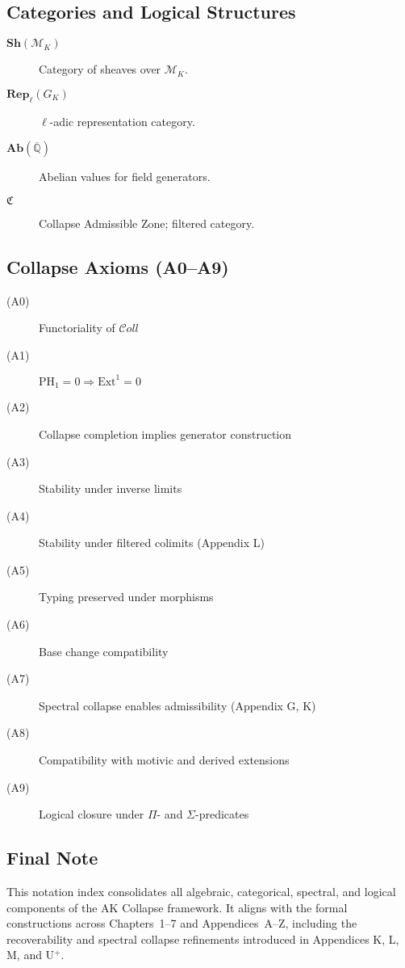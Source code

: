 \documentclass[11pt]{article}
\begin{document}
\subsection*{Categories and Logical Structures}

\begin{description}
  \item[\( \mathbf{Sh}(\mathcal{M}_K) \)] Category of sheaves over \( \mathcal{M}_K \).
  \item[\( \mathbf{Rep}_\ell(G_K) \)] \( \ell \)-adic representation category.
  \item[\( \mathbf{Ab}(\overline{\mathbb{Q}}) \)] Abelian values for field generators.
  \item[\( \mathfrak{C} \)] Collapse Admissible Zone; filtered category.
\end{description}

\subsection*{Collapse Axioms (A0–A9)}

\begin{description}
  \item[(A0)] Functoriality of \( \mathcal{C}oll \)
  \item[(A1)] \( \mathrm{PH}_1 = 0 \Rightarrow \mathrm{Ext}^1 = 0 \)
  \item[(A2)] Collapse completion implies generator construction
  \item[(A3)] Stability under inverse limits
  \item[(A4)] Stability under filtered colimits (Appendix L)
  \item[(A5)] Typing preserved under morphisms
  \item[(A6)] Base change compatibility
  \item[(A7)] Spectral collapse enables admissibility (Appendix G, K)
  \item[(A8)] Compatibility with motivic and derived extensions
  \item[(A9)] Logical closure under \( \Pi \)- and \( \Sigma \)-predicates
\end{description}

\subsection*{Final Note}

This notation index consolidates all algebraic, categorical, spectral, and logical components of the AK Collapse framework.  
It aligns with the formal constructions across Chapters~1–7 and Appendices~A–Z, including the recoverability and spectral collapse refinements introduced in Appendices K, L, M, and U$^+$.
\end{document}
